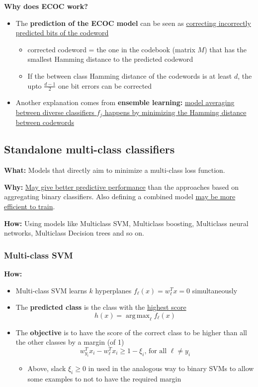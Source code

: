 \documentclass[12pt, a4paper]{article}
\DeclareMathOperator*{\argmax}{arg\,max} %
\begin{document}
\textbf{Why does ECOC work?}

\begin{itemize}
  \item The \textbf{prediction of the ECOC model} can be seen as \uline{correcting incorrectly predicted bits of the codeword}
  \begin{itemize}
    \item corrected codeword = the one in the codebook (matrix $M$) that has the smallest Hamming distance to the predicted codeword
    \item If the between class Hamming distance of the codewords is at least $d$, the upto $\frac{d-1}{2}$ one bit errors can be corrected
  \end{itemize}
  \item Another explanation comes from \textbf{ensemble learning:} \uline{model averaging between diverse classifiers $f_j$ happens by minimizing the Hamming distance between codewords}
\end{itemize}






\subsection{Standalone multi-class classifiers}\label{standalone-multiclass-classifiers}

\textbf{What:} Models that directly aim to minimize a multi-class loss function.

\textbf{Why:} \uline{May give better predictive performance} than the approaches based on aggregating binary classifiers. Also defining a combined model \uline{may be more efficient to train}.

\textbf{How:} Using models like Multiclass SVM, Multiclass boosting, Multiclass neural networks, Multiclass Decision trees and so on.



\subsubsection{Multi-class SVM}\label{multiclass-SVM}


\textbf{How:}

\begin{itemize}
  \item Multi-class SVM learns $k$ hyperplanes $f_{\ell}(x) = w_{\ell}^T x = 0$ simultaneously
  \item The \textbf{predicted class} is the class with the \uline{highest score}
  $$
  h(x) = \argmax_{\ell} f_{\ell}(x)
  $$
  \item The \textbf{objective} is to have the score of the correct class to be higher than all the other classes by a margin (of 1)
  $$
  w_{y_i}^T x_i - w_{\ell}^T x_i \geq 1 - \xi_i \text{, for all } \ell \neq y_i
  $$
  \begin{itemize}
    \item Above, slack $\xi_i \geq 0$ in used in the analogous way to binary SVMs to allow some examples to not to have the required margin
  \end{itemize}
\end{itemize}
\end{document}
